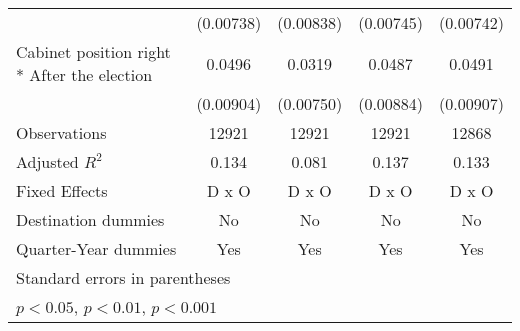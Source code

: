 \begin{table}[htbp]
\begin{tabular}{l*{4}{c}}
                    &   (0.00738)         &   (0.00838)         &   (0.00745)         &   (0.00742)         \\
[1em]
Cabinet position right * After the election&      0.0496\sym{***}&      0.0319\sym{***}&      0.0487\sym{***}&      0.0491\sym{***}\\
                    &   (0.00904)         &   (0.00750)         &   (0.00884)         &   (0.00907)         \\
\hline
Observations        &       12921         &       12921         &       12921         &       12868         \\
Adjusted \(R^{2}\)  &       0.134         &       0.081         &       0.137         &       0.133         \\
Fixed Effects       &       D x O         &       D x O         &       D x O         &       D x O         \\
Destination dummies &          No         &          No         &          No         &          No         \\
Quarter-Year dummies&         Yes         &         Yes         &         Yes         &         Yes         \\
\hline\hline
\multicolumn{5}{l}{\footnotesize Standard errors in parentheses}\\
\multicolumn{5}{l}{\footnotesize \sym{*} \(p<0.05\), \sym{**} \(p<0.01\), \sym{***} \(p<0.001\)}\\
\end{tabular}
\end{table}
